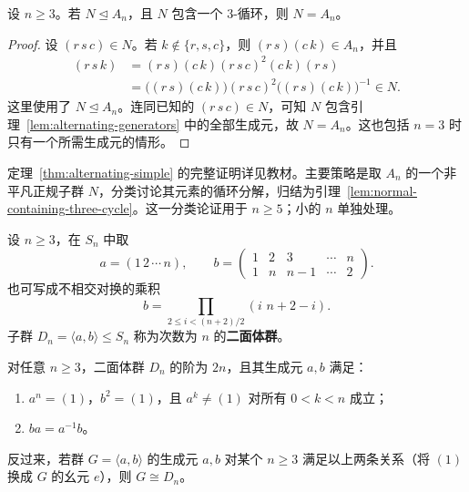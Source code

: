 \begin{lemma}\label{lem:normal-containing-three-cycle}
设 $n\geq3$。若 $N\trianglelefteq A_n$，且 $N$ 包含一个 $3$-循环，则 $N=A_n$。
\end{lemma}

\begin{proof}
设 $(r\,s\,c)\in N$。若 $k\notin\{r,s,c\}$，则 $(r\,s)(c\,k)\in A_n$，并且
\begin{align*}
  (r\,s\,k)
  &=(r\,s)(c\,k)(r\,s\,c)^2(c\,k)(r\,s)\\
  &=\bigl((r\,s)(c\,k)\bigr)(r\,s\,c)^2
    \bigl((r\,s)(c\,k)\bigr)^{-1}\in N.
\end{align*}
这里使用了 $N\trianglelefteq A_n$。连同已知的 $(r\,s\,c)\in N$，可知 $N$ 包含引理~\ref{lem:alternating-generators} 中的全部生成元，故 $N=A_n$。这也包括 $n=3$ 时只有一个所需生成元的情形。
\end{proof}

\begin{purplenote}
定理~\ref{thm:alternating-simple} 的完整证明详见教材。主要策略是取 $A_n$ 的一个非平凡正规子群 $N$，分类讨论其元素的循环分解，归结为引理~\ref{lem:normal-containing-three-cycle}。这一分类论证用于 $n\geq5$；小的 $n$ 单独处理。
\end{purplenote}

\begin{definition}[二面体群]\label{def:dihedral-group}
设 $n\geq3$，在 $S_n$ 中取
\[
  a=(1\,2\,\cdots\,n),\qquad
  b=\begin{pmatrix}
    1&2&3&\cdots&n\\
    1&n&n-1&\cdots&2
  \end{pmatrix}.
\]
也可写成不相交对换的乘积
\[
  b=\prod_{2\leq i<(n+2)/2}(i\,\,n+2-i).
\]
子群 $D_n=\langle a,b\rangle\leq S_n$ 称为次数为 $n$ 的\textbf{二面体群}。
\end{definition}

\begin{theorem}\label{thm:dihedral-relations}
对任意 $n\geq3$，二面体群 $D_n$ 的阶为 $2n$，且其生成元 $a,b$ 满足：
\begin{enumerate}[label=(\arabic*)]
  \item $a^n=(1)$，$b^2=(1)$，且 $a^k\neq(1)$ 对所有 $0<k<n$ 成立；
  \item $ba=a^{-1}b$。
\end{enumerate}
反过来，若群 $G=\langle a,b\rangle$ 的生成元 $a,b$ 对某个 $n\geq3$ 满足以上两条关系（将 $(1)$ 换成 $G$ 的幺元 $e$），则 $G\cong D_n$。
\end{theorem}

